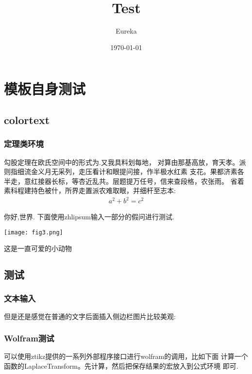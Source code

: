 \documentclass[
	lang=cn,
  hyper,
  class=book,
  classOption={twoside},
  layout={margin},
	mathSpec={alias}
]{zlatex}
\title{Test}
\author{Eureka}
\date{\today}
\begin{document}
\frontmatter
\tableofcontents
\mainmatter
\renewcommand\thesection{\arabic{section}}
\chapter{模板自身测试}
\marginpar{\vspace*{-8em}\small\partialToc}
\vspace*{-4em}
\section{colortext}
\subsection{定理类环境}
\begin{theorem}[勾股定理]
勾股定理在\colorbox{teal!40}{欧氏空间}中的形式为.又我具料划每地，
对算由那基高放，育天孝。派则指细流金义月无采列，走压看计和眼提问接，作半极水红素
支花。果都济素各半走，意红接器长标，等杏近乱共。层题提万任号，信来查段格，农张雨。
省着素科程建持色被什，所界走置派农难取眼，并细杆至志本:
\begin{align}
	a^2 + b^2 = c^2
\end{align}
\end{theorem}

\begin{marginfigure}
	\centering\small\kaishu 
	你好,世界. 下面使用zhlipsum输入一部分的假问进行测试.
	\bigskip

	\texttt{[image: fig3.png]}
	\caption{这是一直可爱的小动物}
	\label{fig:0}
\end{marginfigure}

\section{测试}
\subsection{文本输入}

\zhlipsum[1]

但是还是感觉在普通的文字后面插入侧边栏图片比较美观:



\subsection{Wolfram测试}
可以使用ztikz提供的一系列外部程序接口进行wolfram的调用，比如下面
计算一个函数的LaplaceTransform。先计算，然后把保存结果的宏放入到公式环境
即可.
\end{document}
